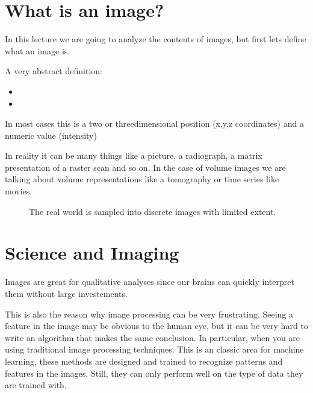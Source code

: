 \documentclass[letterpaper,10pt,english]{sphinxmanual}
\begin{document}
\section{What is an image?}
\label{\detokenize{ML4NeutronImageSegmentation:what-is-an-image}}
In this lecture we are going to analyze the contents of images, but first lets define what an image is.

A very abstract definition:
\begin{itemize}
\item {} 

\item {} 

\end{itemize}

In most cases this is a two\sphinxhyphen{} or three\sphinxhyphen{}dimensional position (x,y,z coordinates) and a numeric value (intensity)


In reality it can be many things like a picture, a radiograph, a matrix presentation of a raster scan and so on. In the case of volume images we are talking about volume representations like a tomography or time series like movies.

\begin{figure}[htbp]
\centering
\capstart

\noindent{}
\caption{The real world is sampled into discrete images with limited extent.}\label{\detokenize{ML4NeutronImageSegmentation:id1}}\end{figure}


\section{Science and Imaging}
\label{\detokenize{ML4NeutronImageSegmentation:science-and-imaging}}
Images are great for qualitative analyses since our brains can quickly interpret them without large  investements.

This is also the reason why image processing can be very frustrating. Seeing a feature in the image may be obvious to the human eye, but it can be very hard to write an algorithm that makes the same conclusion. In particular, when you are using traditional image processing techniques. This is an classic area for machine learning, these methods are designed and trained to recognize patterns and features in the images. Still, they can only perform well on the type of data they are trained with.
\end{document}
